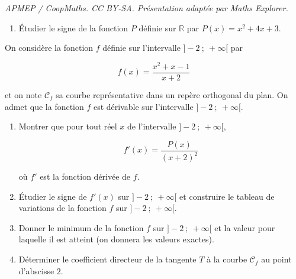 \documentclass[10pt]{article}
\providecommand{\R}{\mathbb{R}}
\begin{document}
\noindent\textit{APMEP / CoopMaths. CC BY-SA. Présentation adaptée par Maths Explorer.}\par\medskip
\medskip

\begin{enumerate}
\item Étudier le signe de la fonction $P$ définie sur $\R$ par $P(x) = x^2 + 4x + 3$.


\end{enumerate}

On considère la fonction $f$ définie sur l'intervalle $]- 2~;~ +\infty[$ par

\[f(x) = \dfrac{x^2 +x - 1}{x + 2}\]

et on note $\mathcal{C}_f$ sa courbe représentative dans un repère orthogonal du plan. On admet que la fonction $f$ est dérivable sur l'intervalle $]- 2~;~ +\infty[$. 

\medskip

\begin{enumerate}[resume]
\item Montrer que pour tout réel $x$ de l'intervalle $]- 2~;~ +\infty[$,

\[f'(x) = \dfrac{P(x)}{(x + 2 )^2}\]

où $f'$ est la fonction dérivée de $f$.

\item Étudier le signe de $f'(x)$ sur $]- 2~;~ +\infty[$ et construire le tableau de variations de la fonction $f$ sur $]- 2~;~ +\infty[$.
\item Donner le minimum de la fonction $f$ sur $]- 2~;~ +\infty[$ et la valeur pour laquelle il est atteint (on donnera les valeurs exactes).
\item Déterminer le coefficient directeur de la tangente $T$ à la courbe $\mathcal{C}_f$ au point d'abscisse $2$.
\end{enumerate}
\end{document}
